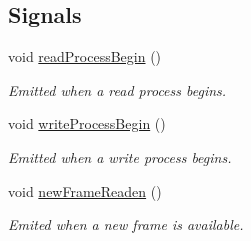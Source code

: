 \subsection*{Signals}
\begin{DoxyCompactItemize}
\item 
void \hyperlink{classmdt_port_thread_helper_a78007ee41a04ffde474087a80858c0ce}{readProcessBegin} ()
\begin{DoxyCompactList}\small\item\em Emitted when a read process begins. \end{DoxyCompactList}\item 
void \hyperlink{classmdt_port_thread_helper_a80df5929776f6c617b96f2184e2bc96d}{writeProcessBegin} ()
\begin{DoxyCompactList}\small\item\em Emitted when a write process begins. \end{DoxyCompactList}\item 
void \hyperlink{classmdt_port_thread_helper_a751006665ed9f110ade8ced5264a5f50}{newFrameReaden} ()
\begin{DoxyCompactList}\small\item\em Emited when a new frame is available. \end{DoxyCompactList}\end{DoxyCompactItemize}
